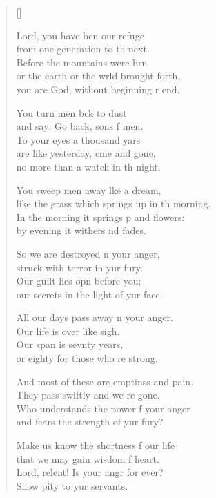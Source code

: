 \settowidth{\versewidth}{like the grass which springs up in the morning.}
\begin{verse}[\versewidth]
  \begin{patverse}
 Lord, you have ben our refuge\Med\\
from one generation to th next.\\
Before the mountains were brn\Flex\\
or the earth or the wrld brought forth,\Med\\
you are God, without beginning r end.

You turn men bck to dust\Med\\
and say: Go back, sons f men.\\
To your eyes a thousand yars\Flex\\
are like yesterday, cme and gone,\Med\\
no more than a watch in th night.

You sweep men away l\pointup{\i}ke a dream,\Med\\
like the grass which springs up in th morning.\\
In the morning it springs p and flowers:\Med\\
by evening it withers nd fades.

So we are destroyed \pointup{\i}n your anger,\Med\\
struck with terror in yur fury.\\
Our guilt lies opn before you;\Med\\
our secrets in the light of yur face.

All our days pass away \pointup{\i}n your anger.\Med\\
Our life is over like  sigh.\\
Our span is sevnty years,\Med\\
or eighty for those who re strong.

And most of these are emptinss and pain.\Med\\
They pass swiftly and we re gone.\\
Who understands the power f your anger\Med\\
and fears the strength of yur fury?

Make us know the shortness f our life\Med\\
that we may gain wisdom f heart.\\
Lord, relent! Is your angr for ever?\Med\\
Show pity to yur servants.


\end{patverse}
\end{verse}
